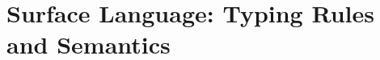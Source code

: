 \section{Surface Language: Typing Rules and Semantics}
\label{appendix:surface-language}












